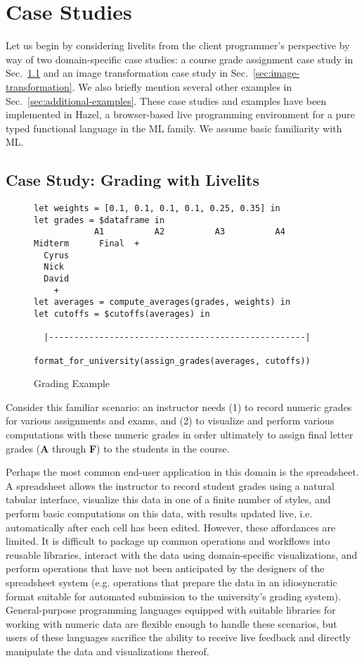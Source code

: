 \section{Case Studies}\label{sec:case-studies}
Let us begin by considering livelits from the client programmer's perspective by way of 
two domain-specific case studies:
a course grade assignment case study in Sec.~\ref{sec:live-grading} 
and an image transformation case study in Sec.~\ref{sec:image-transformation}. 
We also briefly mention several other examples in Sec.~\ref{sec:additional-examples}. 
These case studies and examples have been implemented
in Hazel, a browser-based live programming environment for a pure typed functional language in the
ML family. We assume basic familiarity with ML. 

\subsection{Case Study: Grading with Livelits}\label{sec:live-grading}
\begin{figure}
\begin{lstlisting}
let weights = [0.1, 0.1, 0.1, 0.1, 0.25, 0.35] in 
let grades = $dataframe in 
            A1          A2          A3          A4       Midterm      Final  +
  Cyrus
  Nick
  David
    + 
let averages = compute_averages(grades, weights) in 
let cutoffs = $cutoffs(averages) in 

  |---------------------------------------------------|

format_for_university(assign_grades(averages, cutoffs))
\end{lstlisting}
\caption{Grading Example}
\label{fig:grading}
\end{figure}

Consider this familiar scenario: an instructor needs 
(1) to record numeric grades for various assignments and exams, and 
(2) to visualize and perform various computations with these numeric grades 
in order ultimately to assign final letter grades (\textbf{A} through \textbf{F}) to the students in the course.

Perhaps the most common end-user application in this domain is the spreadsheet.
A spreadsheet allows the instructor to record student grades using a natural tabular interface,
visualize this data in one of a finite number of styles, and perform basic computations on this data,
with results updated live, i.e. automatically after each cell has been edited. 
However, these affordances are limited. It is difficult to package up common operations and workflows 
into reusable libraries, interact with the data using domain-specific visualizations, 
and perform operations that have not been anticipated by the designers of the spreadsheet system 
(e.g. operations that prepare the data in an idiosyncratic format suitable for automated submission 
to the university's grading system). 
General-purpose programming languages equipped with suitable libraries for working with numeric data
are flexible enough to handle these scenarios, but users of these languages 
sacrifice the ability to receive live feedback and directly manipulate the data and visualizations thereof.

